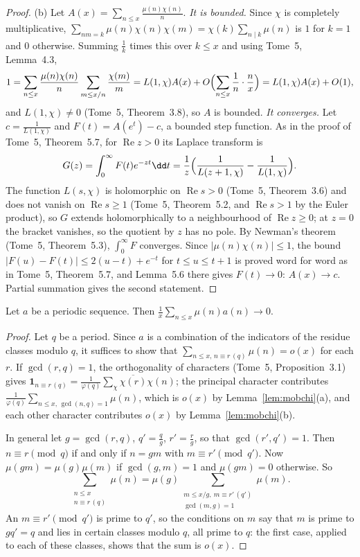 \begin{proof}
(b) Let $A(x)=\sum_{n\le x}\frac{\mu(n)\chi(n)}n$. \emph{It is bounded.} Since $\chi$ is completely multiplicative, $\sum_{nm=k}\mu(n)\chi(n)\chi(m)=\chi(k)\sum_{n\mid k}\mu(n)$
is $1$ for $k=1$ and $0$ otherwise. Summing $\frac1k$ times this over $k\le x$ and using Tome~5, Lemma~4.3,
\[
1=\sum_{n\le x}\frac{\mu(n)\chi(n)}n\sum_{m\le x/n}\frac{\chi(m)}m=L(1,\chi)A(x)+O\Bigl(\sum_{n\le x}\frac1n\cdot\frac nx\Bigr)=L(1,\chi)A(x)+O(1),
\]
and $L(1,\chi)\ne0$ (Tome~5, Theorem~3.8), so $A$ is bounded. \emph{It converges.} Let $c=\frac1{L(1,\chi)}$ and $F(t)=A(e^t)-c$, a bounded step function. As in the proof
of Tome~5, Theorem~5.7, for $\operatorname{Re}z>0$ its Laplace transform is
\[
G(z)=\int_0^\infty F(t)e^{-zt}\dd t=\frac1z\Bigl(\frac1{L(z+1,\chi)}-\frac1{L(1,\chi)}\Bigr).
\]
The function $L(s,\chi)$ is holomorphic on $\operatorname{Re}s>0$ (Tome~5, Theorem~3.6) and does not vanish on $\operatorname{Re}s\ge1$ (Tome~5, Theorem~5.2, and
$\operatorname{Re}s>1$ by the Euler product), so $G$ extends holomorphically to a neighbourhood of $\operatorname{Re}z\ge0$; at $z=0$ the bracket vanishes, so the
quotient by $z$ has no pole. By Newman's theorem (Tome~5, Theorem~5.3), $\int_0^\infty F$ converges. Since $|\mu(n)\chi(n)|\le1$, the bound
$|F(u)-F(t)|\le2(u-t)+e^{-t}$ for $t\le u\le t+1$ is proved word for word as in Tome~5, Theorem~5.7, and Lemma~5.6 there gives $F(t)\to0$: $A(x)\to c$. Partial
summation gives the second statement.
\end{proof}

\begin{proposition}\label{prop:mobperiodic}
Let $a$ be a periodic sequence. Then $\frac1x\sum_{n\le x}\mu(n)a(n)\to0$.
\end{proposition}
\begin{proof}
Let $q$ be a period. Since $a$ is a combination of the indicators of the residue classes modulo $q$, it suffices to show that
$\sum_{n\le x,\,n\equiv r\,(q)}\mu(n)=o(x)$ for each $r$. If $\gcd(r,q)=1$, the orthogonality of characters (Tome~5, Proposition~3.1) gives
$\mathbf1_{n\equiv r\,(q)}=\frac1{\varphi(q)}\sum_\chi\overline{\chi(r)}\chi(n)$; the principal character contributes $\frac1{\varphi(q)}\sum_{n\le x,\,\gcd(n,q)=1}\mu(n)$,
which is $o(x)$ by Lemma~\ref{lem:mobchi}(a), and each other character contributes $o(x)$ by Lemma~\ref{lem:mobchi}(b).

In general let $g=\gcd(r,q)$, $q'=\frac qg$, $r'=\frac rg$, so that $\gcd(r',q')=1$. Then $n\equiv r\pmod q$ if and only if $n=gm$ with $m\equiv r'\pmod{q'}$.
Now $\mu(gm)=\mu(g)\mu(m)$ if $\gcd(g,m)=1$ and $\mu(gm)=0$ otherwise. So
\[
\sum_{\substack{n\le x\\n\equiv r\,(q)}}\mu(n)=\mu(g)\sum_{\substack{m\le x/g,\ m\equiv r'\,(q')\\\gcd(m,g)=1}}\mu(m).
\]
An $m\equiv r'\pmod{q'}$ is prime to $q'$, so the conditions on $m$ say that $m$ is prime to $gq'=q$ and lies in certain classes modulo $q$, all prime to $q$:
the first case, applied to each of these classes, shows that the sum is $o(x)$.
\end{proof}


